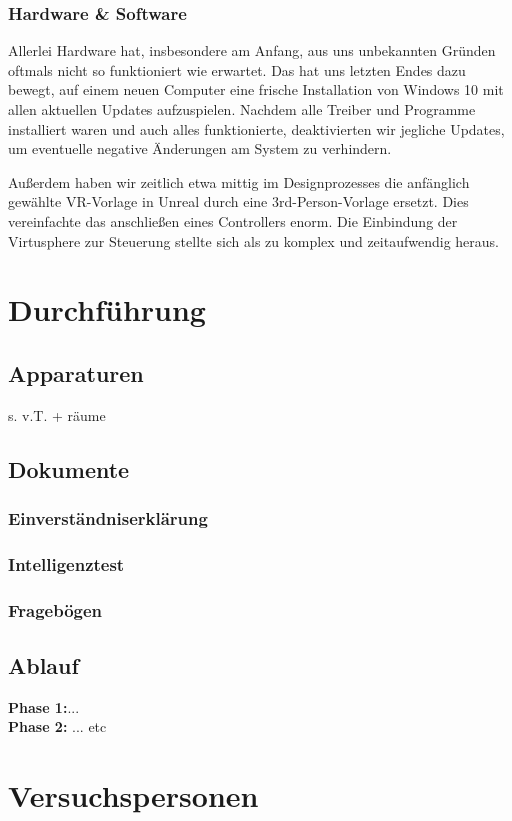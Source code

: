 \documentclass{Bericht}
\begin{document}
		\subsubsection{Hardware \& Software}
			Allerlei Hardware hat, insbesondere am Anfang, aus uns unbekannten Gründen oftmals nicht so funktioniert wie erwartet. Das hat uns letzten Endes dazu bewegt, auf einem neuen Computer eine frische Installation von Windows 10 mit allen aktuellen Updates aufzuspielen. Nachdem alle Treiber und Programme installiert waren und auch alles funktionierte, deaktivierten wir jegliche Updates, um eventuelle negative Änderungen am System zu verhindern. 
			
			Außerdem haben wir zeitlich etwa mittig im Designprozesses die anfänglich gewählte VR-Vorlage in Unreal durch eine 3rd-Person-Vorlage ersetzt. Dies vereinfachte das anschließen eines Controllers enorm. Die Einbindung der Virtusphere zur Steuerung stellte sich als zu komplex und zeitaufwendig heraus. 
		

\section{Durchführung}
\subsection{Apparaturen}
s. v.T. + räume 
\subsection{Dokumente}
\subsubsection{Einverständniserklärung}
\subsubsection{Intelligenztest}
\subsubsection{Fragebögen}
\subsection{Ablauf}
\textbf{Phase 1:}...\\
\textbf{Phase 2:} ... etc\\

\section{Versuchspersonen}
\end{document}
